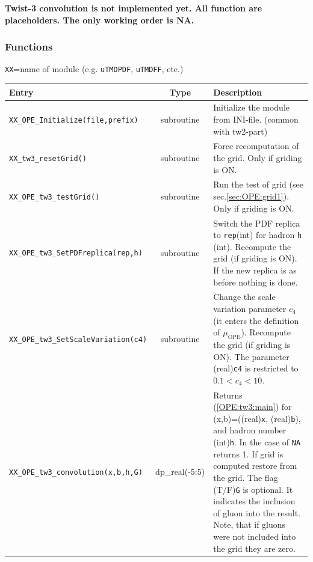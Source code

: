 \documentclass[prd,nofootinbib,eqsecnum,final]{revtex4}
\renewcommand{\(}{\left(}
\renewcommand{\)}{\right)}
\renewcommand{\[}{\left[}
\renewcommand{\]}{\right]}
\newcommand{\red}[1]{{\color[rgb]{1,0,0} #1}}
\begin{document}
\begin{tcolorbox}
\begin{center}
\red{
\textbf{Twist-3 convolution is not implemented yet. All function are placeholders. The only working order is NA.}}
\end{center}
\end{tcolorbox}

\subsubsection{Functions}

\begin{center}
\texttt{XX}=name of module (e.g. \texttt{uTMDPDF}, \texttt{uTMDFF}, etc.)
\\
\begin{tabular}{||p{5.5cm}||c||p{8.5cm}||}
\hline\hline
Entry &~~Type~~& Description
\\\hline
\texttt{XX\_OPE\_Initialize(file,prefix)} & subroutine & Initialize the module from INI-file. (common with tw2-part)
\\\hline
\texttt{XX\_tw3\_resetGrid()} & subroutine & Force recomputation of the grid. Only if griding is ON.
\\\hline
\texttt{XX\_OPE\_tw3\_testGrid()} & subroutine & Run the test of grid (see sec.\ref{sec:OPE:grid1}).  Only if griding is ON.
\\\hline
\texttt{XX\_OPE\_tw3\_SetPDFreplica(rep,h)} & subroutine & Switch the PDF replica to \texttt{rep}(int) for hadron \texttt{h} (int). Recompute the grid (if griding is ON). If the new replica is as before nothing is done.
\\\hline
\texttt{XX\_OPE\_tw3\_SetScaleVariation(c4)} & subroutine & Change the scale variation parameter $c_4$ (it enters the definition of $\mu_{\text{OPE}}$). Recompute the grid (if griding is ON). The parameter (real)\texttt{c4} is restricted to $0.1<c_4<10$.
\\\hline\hline
\texttt{XX\_OPE\_tw3\_convolution(x,b,h,G)} & dp\_real(-5:5) & Returns (\ref{OPE:tw3:main}) for (x,b)=((real)\texttt{x}, (real)\texttt{b}), and hadron number (int)\texttt{h}. In the case of \texttt{NA} returns 1. If grid is computed restore from the grid. The flag (T/F)\texttt{G} is optional. It indicates the inclusion of gluon into the result. Note, that if gluons were not included into the grid they are zero.
\\\hline\hline
\end{tabular}
\end{center}
\end{document}
